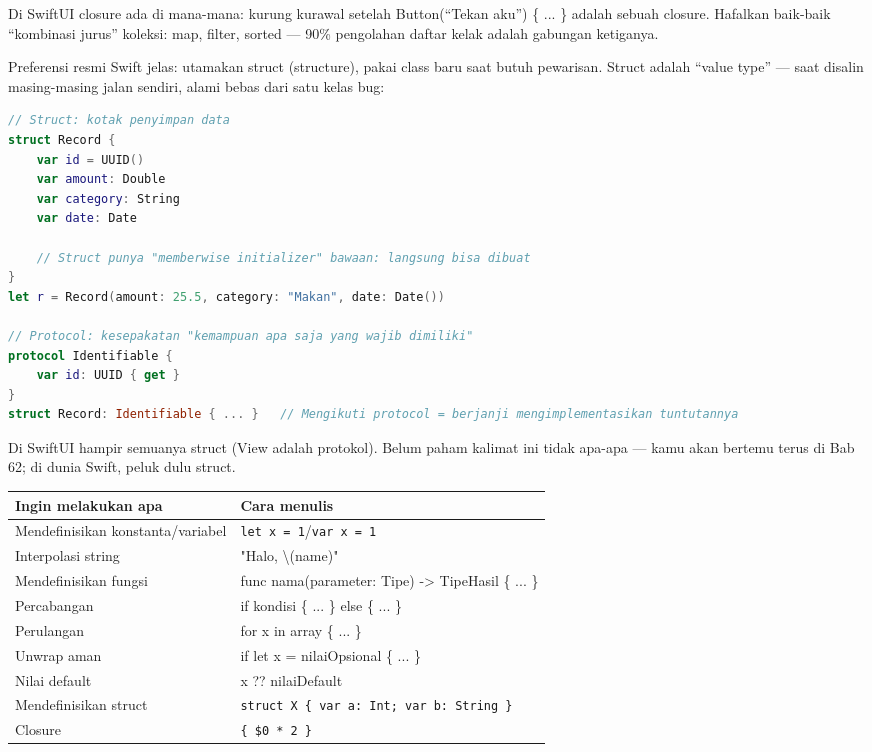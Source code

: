 Di SwiftUI closure ada di mana-mana: kurung kurawal setelah Button(“Tekan aku”) \{ ... \} adalah sebuah closure. Hafalkan baik-baik “kombinasi jurus” koleksi: map, filter, sorted — 90\% pengolahan daftar kelak adalah gabungan ketiganya.


Preferensi resmi Swift jelas: utamakan struct (structure), pakai class baru saat butuh pewarisan. Struct adalah “value type” — saat disalin masing-masing jalan sendiri, alami bebas dari satu kelas bug:

\begin{lstlisting}[language=Swift]
// Struct: kotak penyimpan data
struct Record {
    var id = UUID()
    var amount: Double
    var category: String
    var date: Date

    // Struct punya "memberwise initializer" bawaan: langsung bisa dibuat
}
let r = Record(amount: 25.5, category: "Makan", date: Date())

// Protocol: kesepakatan "kemampuan apa saja yang wajib dimiliki"
protocol Identifiable {
    var id: UUID { get }
}
struct Record: Identifiable { ... }   // Mengikuti protocol = berjanji mengimplementasikan tuntutannya
\end{lstlisting}

Di SwiftUI hampir semuanya struct (View adalah protokol). Belum paham kalimat ini tidak apa-apa — kamu akan bertemu terus di Bab 62; di dunia Swift, peluk dulu struct.


\begin{center}
\begin{tabularx}{\linewidth}{|X|X|}
\hline
\textbf{Ingin melakukan apa} & \textbf{Cara menulis} \tabularnewline
\hline
Mendefinisikan konstanta/variabel & \texttt{let x = 1}/\texttt{var x = 1} \tabularnewline
Interpolasi string & "Halo, \textbackslash{}(name)" \tabularnewline
Mendefinisikan fungsi & func nama(parameter: Tipe) -> TipeHasil \{ ... \} \tabularnewline
Percabangan & if kondisi \{ ... \} else \{ ... \} \tabularnewline
Perulangan & for x in array \{ ... \} \tabularnewline
Unwrap aman & if let x = nilaiOpsional \{ ... \} \tabularnewline
Nilai default & x ?? nilaiDefault \tabularnewline
Mendefinisikan struct & \texttt{struct X \{ var a: Int; var b: String \}} \tabularnewline
Closure & \texttt{\{ \$0 * 2 \}} \tabularnewline
\hline
\end{tabularx}
\end{center}

